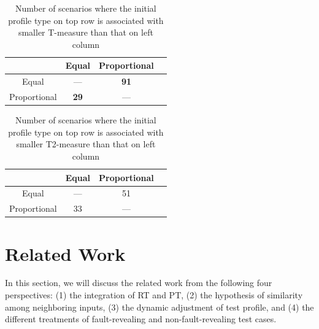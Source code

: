 \documentclass[10pt,journal,compsoc]{IEEEtran}
\begin{document}
\begin{table}
\caption{Number of scenarios where the initial profile type on top row is associated with smaller T-measure than that on left column}
\label{tab:PstaT}
\centering
\begin{tabular}{|c|c|c|c|} \hline
							& Equal				& Proportional	\\ \hline
Equal					& ---					& \textbf{91}		\\ \hline
Proportional	& \textbf{29}	& ---						\\ \hline
\end{tabular}
\end{table}

\begin{table}
\caption{Number of scenarios where the initial profile type on top row is associated with smaller T2-measure than that on left column}
\label{tab:PstaT2}
\centering
\begin{tabular}{|c|c|c|c|} \hline
							& Equal				& Proportional	\\ \hline
Equal					& ---					& 51						\\ \hline
Proportional	& 33					& ---						\\ \hline
\end{tabular}
\end{table}

\section{Related Work}
\label{sec:related}

In this section, we will discuss the related work from the following four perspectives: (1) the integration of RT and PT, (2) the hypothesis of similarity among neighboring inputs, (3) the dynamic adjustment of test profile, and (4) the different treatments of fault-revealing and non-fault-revealing test cases.
\end{document}
